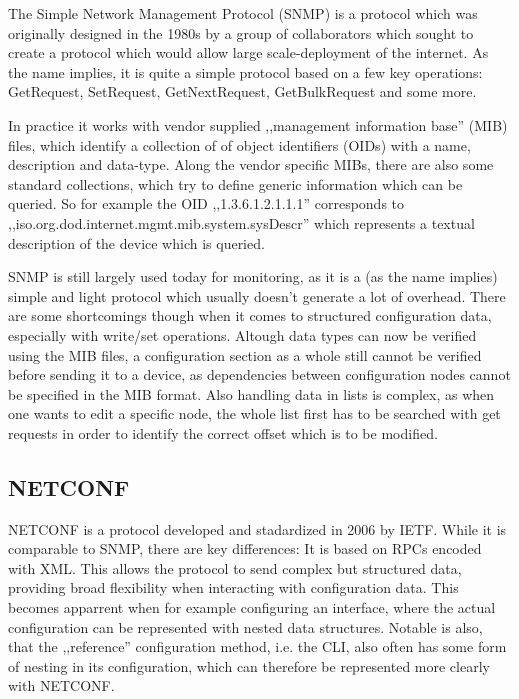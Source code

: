The Simple Network Management Protocol (SNMP)\cite{fedor_simple_1990} is a protocol which was originally
designed in the 1980s by a group of collaborators which sought to create a protocol which would
allow large scale-deployment of the internet.
As the name implies, it is quite a simple protocol based on a few key operations:
GetRequest, SetRequest, GetNextRequest, GetBulkRequest and some more.

In practice it works with vendor supplied ,,management information base'' (MIB) files, which identify a collection of
of object identifiers (OIDs) with a name, description and data-type. 
Along the vendor specific MIBs, there are also some standard collections,
which try to define generic information which can be queried.
So for example the OID ,,1.3.6.1.2.1.1.1'' corresponds to ,,iso.org.dod.internet.mgmt.mib.system.sysDescr''
which represents a textual description of the device which is queried.

SNMP is still largely used today for monitoring, as it is a (as the name implies) simple and light protocol
which usually doesn't generate a lot of overhead. There are some shortcomings though when it comes to
structured configuration data, especially with write/set operations. Altough data types can now be verified
using the MIB files, a configuration section as a whole still cannot be verified before sending it to a device,
as dependencies between configuration nodes cannot be specified in the MIB format. Also handling data
in lists is complex, as when one wants to edit a specific node, the whole list first has to be searched
with get requests in order to identify the correct offset which is to be modified.

\subsection{NETCONF}

NETCONF is a protocol developed and stadardized in 2006  by \acrshort{IETF}.
While it is comparable to SNMP, there are key differences:
It is based on \acrfull{RPC}s encoded with XML.
This allows the protocol to send complex but structured data, providing broad flexibility
when interacting with configuration data. 
This becomes apparrent when for example configuring an interface, where the actual configuration
can be represented with nested data structures.
Notable is also, that the ,,reference'' configuration method, i.e. the CLI, also often has some form
of nesting in its configuration, which can therefore be represented more clearly with NETCONF.

